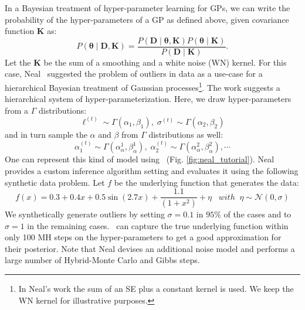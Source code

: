 In a Bayesian treatment of  hyper-parameter learning for \ac{GP}s,
we can write the probability of the hyper-parameters of a GP as
defined above, given covariance function $\mathbf{K}$ as:
\begin{equation}
\label{eq:hyperProbability}
P(\bm{\theta} \mid \mathbf{D,K}) = \frac{P(\mathbf{D} \mid \bm{\theta}, \mathbf{K})P(\bm{\theta} \mid  \mathbf{K})}{P(\mathbf{D} \mid \mathbf{K})}.
\end{equation}
Let the $\mathbf{K}$ be the sum of a smoothing and a white noise (WN) kernel. For this case, Neal~\citeyearpar{neal1997monte} suggested the problem of outliers in data as a use-case for a hierarchical Bayesian treatment of Gaussian processes\footnote{In Neal's work \citeyearpar{neal1997monte} the sum of an SE plus a constant kernel is used. We keep the WN kernel for illustrative purposes.}. The work suggests a hierarchical system of hyper-parameterization. Here, we draw hyper-parameters from a $\Gamma$ distributions:
\begin{equation}
\label{eq:hyper-ell}
\ell^{(t)} \sim \Gamma(\alpha_1,\beta_1),\;\sigma^{(t)} \sim \Gamma(\alpha_2,\beta_2)
\end{equation} 
and in turn sample the $\alpha$ and $\beta$ from $\Gamma$ distributions as well:
\begin{equation}
\label{eq:hyper-alpha}
\alpha_1^{(t)} \sim \Gamma(\alpha^1_{\alpha},\beta^1_{ \alpha } ),\; \alpha_2^{(t)} \sim \Gamma(\alpha^2_{\alpha},\beta^2_{\alpha}),\cdots
\end{equation}
One can represent this kind of model using \gpmem\ (Fig. \ref{fig:neal_tutorial}).
Neal provides a custom inference algorithm setting and evaluates it using the following synthetic data problem. Let $f$ be the underlying function that generates the data:
\begin{equation}
f(x) =  0.3 + 0.4 x + 0.5 \sin(2.7x) + \frac{1.1}{(1+ x^2)} + \eta \;\;\; with\;\;\eta \sim \mathcal{N}(0,\sigma)
\end{equation}
We synthetically generate outliers by setting $\sigma = 0.1$ in $95\%$ of the cases and to $\sigma = 1$ in the remaining cases. \gpmem\  can capture the true underlying function within only 100 MH steps on the hyper-parameters to get a good approximation for their posterior. Note that Neal devises an additional noise model and performs a large number of Hybrid-Monte Carlo and Gibbs steps.  
